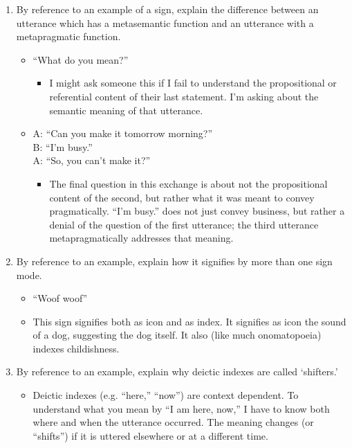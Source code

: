 \documentclass[doc,12pt]{apa6}
\providecommand{\tightlist}{%
  \setlength{\itemsep}{0pt}\setlength{\parskip}{0pt}}
\begin{document}
\begin{enumerate}
\def\labelenumi{\arabic{enumi}.}
\setcounter{enumi}{1}
\tightlist
\item
  By reference to an example of a sign, explain the difference between
  an utterance which has a metasemantic function and an utterance with a
  metapragmatic function.

  \begin{itemize}
  \tightlist
  \item
    ``What do you mean?''

    \begin{itemize}
    \tightlist
    \item
      I might ask someone this if I fail to understand the propositional
      or referential content of their last statement. I'm asking about
      the semantic meaning of that utterance.
    \end{itemize}
  \item
    A: ``Can you make it tomorrow morning?''\\
     B: ``I'm busy.''\\
     A: ``So, you can't make it?''

    \begin{itemize}
    \tightlist
    \item
      The final question in this exchange is about not the propositional
      content of the second, but rather what it was meant to convey
      pragmatically. ``I'm busy.'' does not just convey business, but
      rather a denial of the question of the first utterance; the third
      utterance metapragmatically addresses that meaning.
    \end{itemize}
  \end{itemize}
\item
  By reference to an example, explain how it signifies by more than one
  sign mode.

  \begin{itemize}
  \tightlist
  \item
    ``Woof woof''
  \item
    This sign signifies both as icon and as index. It signifies as icon
    the sound of a dog, suggesting the dog itself. It also (like much
    onomatopoeia) indexes childishness.
  \end{itemize}
\item
  By reference to an example, explain why deictic indexes are called
  `shifters.'

  \begin{itemize}
  \tightlist
  \item
    Deictic indexes (e.g. ``here,'' ``now'') are context dependent. To
    understand what you mean by ``I am here, now,'' I have to know both
    where and when the utterance occurred. The meaning changes (or
    ``shifts'') if it is uttered elsewhere or at a different time.
  \end{itemize}


\end{enumerate}
\end{document}
